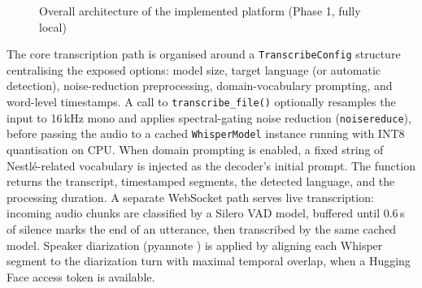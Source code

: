 \documentclass[12pt]{report}
\begin{document}
\begin{figure}[H]
\centering
{}
\caption{Overall architecture of the implemented platform (Phase 1, fully local)}
\label{fig:architecture}
\end{figure}
The core transcription path is organised around a \texttt{TranscribeConfig} structure centralising the exposed options: model size, target language (or automatic detection), noise-reduction preprocessing, domain-vocabulary prompting, and word-level timestamps. A call to \texttt{transcribe\_file()} optionally resamples the input to 16\,kHz mono and applies spectral-gating noise reduction (\texttt{noisereduce}), before passing the audio to a cached \texttt{WhisperModel} instance running with INT8 quantisation on CPU. When domain prompting is enabled, a fixed string of Nestl\'e-related vocabulary is injected as the decoder's initial prompt. The function returns the transcript, timestamped segments, the detected language, and the processing duration. A separate WebSocket path serves live transcription: incoming audio chunks are classified by a Silero VAD model, buffered until 0.6\,s of silence marks the end of an utterance, then transcribed by the same cached model. Speaker diarization (pyannote \cite{bredin2020pyannote}) is applied by aligning each Whisper segment to the diarization turn with maximal temporal overlap, when a Hugging Face access token is available.
\end{document}
